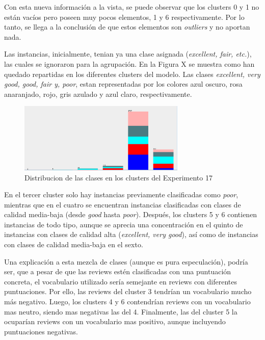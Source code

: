 \documentclass[12pt,a4paper, xcolor=table]{article}
\begin{document}
\newpage

Con esta nueva información a la vista, se puede observar que los clusters 0 y 1 no están vacíos pero poseen muy pocos elementos, 1 y 6 respectivamente. Por lo tanto, se llega a la conclusión de que estos elementos son \textit{outliers} y no aportan nada.

\vspace{4mm}

Las instancias, inicialmente, tenian ya una clase asignada (\textit{excellent, fair, etc.}), las cuales se ignoraron para la agrupación. En la Figura X se muestra como han quedado repartidas en los diferentes clusters del modelo. Las clases \textit{excellent, very good, good, fair y, poor}, estan representadas por los colores azul oscuro, rosa anaranjado, rojo, gris azulado y azul claro, respectivamente.

\begin{figure}[h]
  \centering
  \includegraphics[width=300px]{img/clusters_class.png}
  \caption{Distribucion de las clases en los clusters del Experimento 17}
  \label{fig:graf_exp1}
\end{figure}

\vspace{2mm}

En el tercer cluster solo hay instancias previamente clasificadas como \textit{poor}, mientras que en el cuatro se encuentran instancias clasificadas con clases de calidad media-baja (desde \textit{good} hasta \textit{poor}). Después, los clusters 5 y 6 contienen instancias de todo tipo, aunque se aprecia una concentración en el quinto de instancias con clases de calidad alta (\textit{excellent, very good}), así como de instancias con clases de calidad media-baja en el sexto.  

\vspace{2mm}

Una explicación a esta mezcla de clases (aunque es pura especulación), podría ser, que a pesar de que las reviews estén clasificadas con una puntuación concreta, el vocabulario utilizado sería semejante en reviews con diferentes puntuaciones. Por ello, las reviews del cluster 3 tendrían un vocabulario mucho más negativo. Luego, los clusters 4 y 6 contendrían reviews con un vocabulario mas neutro, siendo mas negativas las del 4. Finalmente, las del cluster 5 la ocuparían reviews con un vocabulario mas positivo, aunque incluyendo puntuaciones negativas. 
\end{document}
